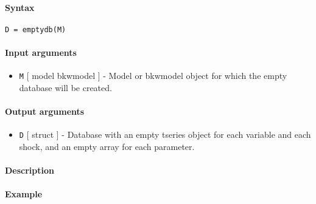 


	\paragraph{Syntax}

\begin{verbatim}
D = emptydb(M)
\end{verbatim}

\paragraph{Input arguments}

\begin{itemize}
\itemsep1pt\parskip0pt
\item
  \texttt{M} {[} model \textbar{} bkwmodel {]} - Model or bkwmodel
  object for which the empty database will be created.
\end{itemize}

\paragraph{Output arguments}

\begin{itemize}
\itemsep1pt\parskip0pt
\item
  \texttt{D} {[} struct {]} - Database with an empty tseries object for
  each variable and each shock, and an empty array for each parameter.
\end{itemize}

\paragraph{Description}

\paragraph{Example}


